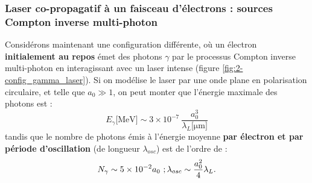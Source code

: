 \begin{refsection}
\subsubsection{Laser co-propagatif à un faisceau d'électrons : sources Compton inverse multi-photon}

Considérons maintenant une configuration différente, où un électron \textbf{initialement au repos} émet des photons $\gamma$ par le processus Compton inverse multi-photon en interagissant avec un laser intense (figure \ref{fig:2-config_gamma_laser}). Si on modélise le laser par une onde plane en polarisation circulaire, et telle que $a_0 \gg 1$, on peut monter que l'énergie maximale des photons est \parencite{corde_2013a}:
\begin{equation}
    E_\gamma \si{[\MeV]} \sim 3\times 10^{-7} ~  \dfrac{a_0^3}{\lambda_L\si{[\um]}}
\end{equation}
tandis que le nombre de photons émis à l'énergie moyenne \textbf{par électron et par période d'oscillation} (de longueur $\lambda_{osc}$) est de l'ordre de \parencite{corde_2013a} :
\begin{equation}
    N_\gamma \sim 5 \times 10^{-2} a_0 ~ ; \lambda_{osc} \sim  \dfrac{a_0^2}{4} \lambda_L \rm .
\end{equation}


\end{refsection}
